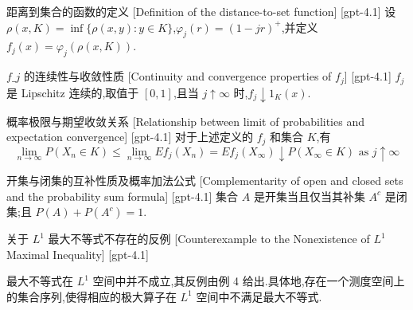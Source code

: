 \documentclass[UTF8]{ctexart}
\begin{document}
    
    
    \begin{dfn}
        {距离到集合的函数的定义}
        [Definition of the distance-to-set function]
        [gpt-4.1]
        设 $\rho(x, K) = \inf\{ \rho(x, y) : y \in K \}$,$\varphi_{j}(r) = (1 - j r)^{+}$,并定义 $f_{j}(x) = \varphi_{j}(\rho(x, K))$.
    \end{dfn}
    
    
    
    \begin{ppt}
        {$f\_j$ 的连续性与收敛性质}
        [Continuity and convergence properties of $f_j$]
        [gpt-4.1]
        $f_{j}$ 是 Lipschitz 连续的,取值于 $[0,1]$,且当 $j \uparrow \infty$ 时,$f_{j} \downarrow 1_{K}(x)$.
    \end{ppt}
    
    
    
    \begin{thm}
        {概率极限与期望收敛关系}
        [Relationship between limit of probabilities and expectation convergence]
        [gpt-4.1]
        对于上述定义的 $f_j$ 和集合 $K$,有
\[
\lim_{n \to \infty} P(X_{n} \in K) \leq \lim_{n \to \infty} E f_{j}(X_{n}) = E f_{j}(X_{\infty}) \downarrow P(X_{\infty} \in K) \text{ as } j \uparrow \infty
\]

    \end{thm}
    
    
    
    \begin{ppt}
        {开集与闭集的互补性质及概率加法公式}
        [Complementarity of open and closed sets and the probability sum formula]
        [gpt-4.1]
        集合 $A$ 是开集当且仅当其补集 $A^{c}$ 是闭集;且 $P(A) + P(A^{c}) = 1$.
    \end{ppt}
    
    
    
    \begin{cxmp}
        {关于 $L^1$ 最大不等式不存在的反例}
        [Counterexample to the Nonexistence of $L^1$ Maximal Inequality]
        [gpt-4.1]
        
最大不等式在 $L^1$ 空间中并不成立,其反例由例 4 给出.具体地,存在一个测度空间上的集合序列,使得相应的极大算子在 $L^1$ 空间中不满足最大不等式.

    \end{cxmp}
    
\end{document}
